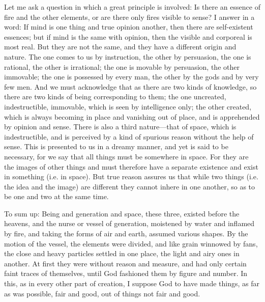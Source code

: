 Let me ask a question in which a great principle is involved: Is there an
essence of fire and the other elements, or are there only fires visible to
sense? I answer in a word: If mind is one thing and true opinion another,
then there are self-existent essences; but if mind is the same with
opinion, then the visible and corporeal is most real. But they are not the
same, and they have a different origin and nature. The one comes to us by
instruction, the other by persuasion, the one is rational, the other is
irrational; the one is movable by persuasion, the other immovable; the one
is possessed by every man, the other by the gods and by very few men. And
we must acknowledge that as there are two kinds of knowledge, so there are
two kinds of being corresponding to them; the one uncreated,
indestructible, immovable, which is seen by intelligence only; the other
created, which is always becoming in place and vanishing out of place, and
is apprehended by opinion and sense. There is also a third nature—that
of space, which is indestructible, and is perceived by a kind of spurious
reason without the help of sense. This is presented to us in a dreamy
manner, and yet is said to be necessary, for we say that all things must
be somewhere in space. For they are the images of other things and must
therefore have a separate existence and exist in something (i.e. in
space). But true reason assures us that while two things (i.e. the idea
and the image) are different they cannot inhere in one another, so as to
be one and two at the same time.

To sum up: Being and generation and space, these three, existed before the
heavens, and the nurse or vessel of generation, moistened by water and
inflamed by fire, and taking the forms of air and earth, assumed various
shapes. By the motion of the vessel, the elements were divided, and like
grain winnowed by fans, the close and heavy particles settled in one
place, the light and airy ones in another. At first they were without
reason and measure, and had only certain faint traces of themselves, until
God fashioned them by figure and number. In this, as in every other part
of creation, I suppose God to have made things, as far as was possible,
fair and good, out of things not fair and good.

